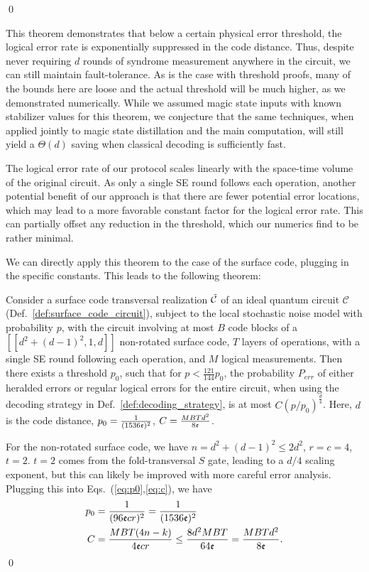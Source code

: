 \qed

This theorem demonstrates that below a certain physical error threshold, the logical error rate is exponentially suppressed in the code distance.
%
Thus, despite never requiring $d$ rounds of syndrome measurement anywhere in the circuit, we can still maintain fault-tolerance.
%
As is the case with threshold proofs, many of the bounds here are loose and the actual threshold will be much higher, as we demonstrated numerically.
%
While we assumed magic state inputs with known stabilizer values for this theorem, we conjecture that the same techniques, when applied jointly to magic state distillation and the main computation, will still yield a $\Theta(d)$ saving when classical decoding is sufficiently fast.

The logical error rate of our protocol scales linearly with the space-time volume of the original circuit.
%
As only a single SE round follows each operation, another potential benefit of our approach is that there are fewer potential error locations, which may lead to a more favorable constant factor for the logical error rate.
%
This can partially offset any reduction in the threshold, which our numerics find to be rather minimal.

We can directly apply this theorem to the case of the surface code, plugging in the specific constants.
%
This leads to the following theorem:

\begin{thm}
Consider a surface code transversal realization $\tilde{\mathcal{C}}$ of an ideal quantum circuit $\mathcal{C}$ (Def.~\ref{def:surface_code_circuit}), subject to the local stochastic noise model with probability $p$, with the circuit involving at most $B$ code blocks of a $[[d^2+(d-1)^2,1,d]]$ non-rotated surface code, $T$ layers of operations, with a single SE round following each operation, and $M$ logical measurements.
%
Then there exists a threshold $p_0$, such that for $p<\frac{121}{144}p_0$, the probability $P_{err}$ of either heralded errors or regular logical errors for the entire circuit, when using the decoding strategy in Def.~\ref{def:decoding_strategy}, is at most $C(p/p_0)^{\frac{d}{4}}$.
%
Here, $d$ is the code distance,  $p_0=\frac{1}{(1536\mathfrak{e})^2}$, $C=\frac{MBTd^2}{8\mathfrak{e}}$.
\end{thm}

For the non-rotated surface code, we have $n=d^2+(d-1)^2\leq 2d^2$, $r=c=4$, $t=2$.
%
$t=2$ comes from the fold-transversal $S$ gate, leading to a $d/4$ scaling exponent, but this can likely be improved with more careful error analysis.
%
Plugging this into Eqs.~(\ref{eq:p0},\ref{eq:c}), we have
\begin{align}
p_0&=\frac{1}{(96\mathfrak{e} cr)^2}=\frac{1}{(1536\mathfrak{e})^2}\\
C&=\frac{MBT(4n-k)}{4\mathfrak{e} cr}\leq \frac{8d^2MBT}{64\mathfrak{e}}=\frac{MBTd^2}{8\mathfrak{e}}.
\end{align}
\qed


